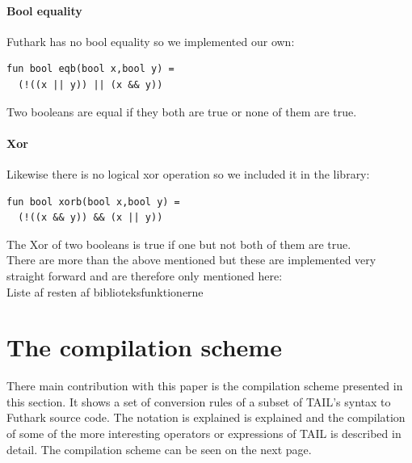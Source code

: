 \documentclass[11pt]{article}
\begin{document}
\paragraph{Bool equality}

Futhark has no bool equality so we implemented our own:

\begin{lstlisting}[language=Futhark]
fun bool eqb(bool x,bool y) =
  (!((x || y)) || (x && y))
\end{lstlisting}

Two booleans are equal if they both are true or none of them are true.
\paragraph{Xor} Likewise there is no logical xor operation so we included it in the library:

\begin{lstlisting}[language=Futhark]
fun bool xorb(bool x,bool y) =
  (!((x && y)) && (x || y))
\end{lstlisting}

The Xor of two booleans is true if one but not both of them are true.
\\

There are more than the above mentioned but these are implemented very straight forward and are therefore only mentioned here: \\

Liste af resten af biblioteksfunktionerne


\section{The compilation scheme}
\label{sec:scheme}
There main contribution with this paper is the compilation scheme presented in this section.
It shows a set of conversion rules of a subset of TAIL's syntax to Futhark source code.
The notation is explained is explained and the compilation of some of the more interesting operators or expressions of TAIL is described in detail. The compilation scheme can be seen on the next page.\\
\end{document}
